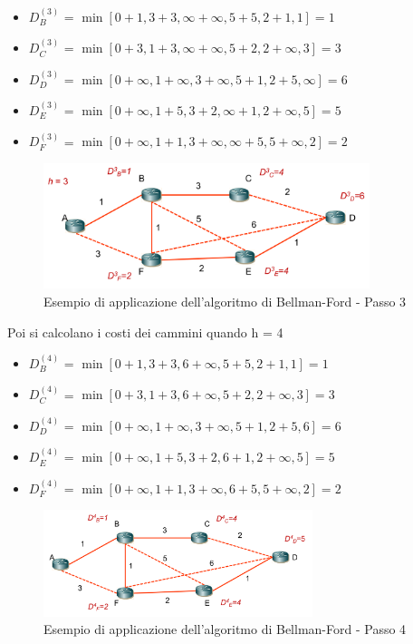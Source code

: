 \begin{itemize}
    \item $D_B^{(3)}$ = $\min [0 + 1, 3 + 3, \infty + \infty, 5 + 5, 2 + 1, 1] = 1$
    \item $D_C^{(3)}$ = $\min [0 + 3, 1 + 3, \infty + \infty, 5 + 2, 2 + \infty, 3] = 3$
    \item $D_D^{(3)}$ = $\min [0 + \infty, 1 + \infty, 3 + \infty, 5 + 1, 2 + 5, \infty] = 6$
    \item $D_E^{(3)}$ = $\min [0 + \infty, 1 + 5, 3 + 2, \infty + 1, 2 + \infty, 5] = 5$    
    \item $D_F^{(3)}$ = $\min [0 + \infty, 1 + 1, 3 + \infty, \infty + 5, 5 + \infty, 2] = 2$
\end{itemize}

\begin{figure}[h!]
    \centering
    \includegraphics[width=0.85\textwidth]{images/bf4.png}
    \caption{Esempio di applicazione dell'algoritmo di Bellman-Ford - Passo 3}
    \label{fig:bf4}
\end{figure}

\newpage

Poi si calcolano i costi dei cammini quando h = 4

\begin{itemize}
   
    \item $D_B^{(4)}$ =  $\min [0 + 1, 3 + 3, 6 + \infty, 5 + 5, 2 + 1, 1] = 1$
    \item $D_C^{(4)}$ = $\min [0 + 3, 1 + 3, 6 + \infty, 5 + 2, 2 + \infty, 3] = 3$
    \item $D_D^{(4)}$ = $\min [0 + \infty, 1 + \infty, 3 + \infty, 5 + 1, 2 + 5, 6] = 6$
    \item $D_E^{(4)}$ = $\min [0 + \infty, 1 + 5, 3 + 2, 6 + 1, 2 + \infty, 5] = 5$
    \item $D_F^{(4)}$ = $\min [0 + \infty, 1 + 1, 3 + \infty, 6 + 5, 5 + \infty, 2] = 2$
\end{itemize}



\begin{figure}[h!]
    \centering
    \includegraphics[width=0.7\textwidth]{images/bf5.png}
    \caption{Esempio di applicazione dell'algoritmo di Bellman-Ford - Passo 4}
    \label{fig:bf5}
\end{figure}


